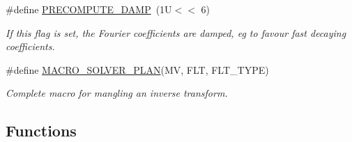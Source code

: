 \begin{CompactItemize}
\#define \hyperlink{group__solver_ga41}{PRECOMPUTE\_\-DAMP}~(1U$<$$<$ 6)
\begin{CompactList}\small\item\em If this flag is set, the Fourier coefficients are damped, eg to favour fast decaying coefficients. \item\end{CompactList}\item 
\#define \hyperlink{group__solver_ga42}{MACRO\_\-SOLVER\_\-PLAN}(MV, FLT, FLT\_\-TYPE)
\begin{CompactList}\small\item\em Complete macro for mangling an inverse transform. \item\end{CompactList}\end{CompactItemize}
\subsection*{Functions}
